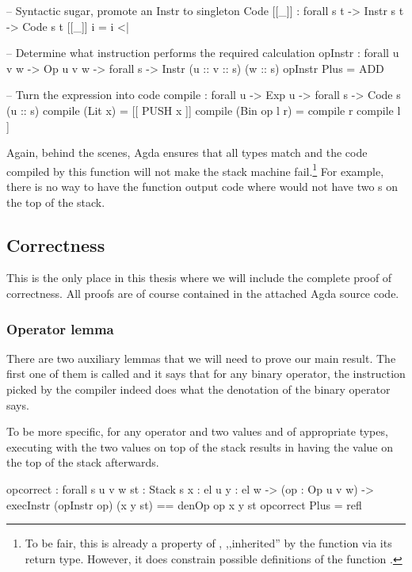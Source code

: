 \begin{code}
  -- Syntactic sugar, promote an Instr to singleton Code
  [[_\;]] : forall {s t} -> Instr s t -> Code s t
  [[_\;]] i = i <| \nil

  -- Determine what instruction performs the required calculation
  opInstr : forall {u v w} -> Op u v w -> forall {s} -> Instr (u :: v :: s) (w :: s)
  opInstr Plus = ADD

  -- Turn the expression into code
  compile : forall {u} -> Exp u -> forall {s} -> Code s (u :: s)
  compile (Lit x) = [[ PUSH x ]]
  compile (Bin op l r) = compile r \app compile l \app [[ opInstr op ]]
\end{code}

Again, behind the scenes, Agda ensures that all types match and the code
compiled by this function will not make the stack machine fail.\footnote{
To be fair, this is already a property of ,
,,inherited'' by the function  via its return type.
However, it does constrain possible definitions of the function .}
For example,
there is no way to have the function  output code where
 would not have two s on the top of the
stack.

\subsection{Correctness}

This is the only place in this thesis where we will include the complete proof
of correctness. All proofs are of course contained in the attached Agda source
code.

\subsubsection{Operator lemma}

There are two auxiliary lemmas that we will need to prove our main result. The
first one of them is called  and it says that for any binary
operator, the instruction picked by the compiler indeed does what the
denotation of the binary operator says.

To be more specific, for any operator  and two values  and
 of appropriate types, executing  with the two
values on top of the stack results in having the value 
on the top of the stack afterwards.

\begin{code}
  op\-correct : forall {s u v w} {st : Stack s} {x : el u} {y : el w}
    -> (op : Op u v w)
    -> execInstr (opInstr op) (x \scons y \scons st) == denOp op x y \scons st
  op\-correct Plus = refl
\end{code}

